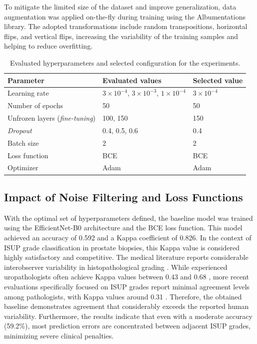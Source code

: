 To mitigate the limited size of the dataset and improve generalization, data augmentation was applied on-the-fly during training using the Albumentations library. The adopted transformations include random transpositions, horizontal flips, and vertical flips, increasing the variability of the training samples and helping to reduce overfitting.

\begin{table}[htb]
	\centering
	\begin{tabular}{lll}
		\toprule
		\textbf{Parameter} & \textbf{Evaluated values} & \textbf{Selected value} \\
		\midrule
		Learning rate & $3\times10^{-4}$, $3\times10^{-3}$, $1\times10^{-4}$ & $3\times10^{-4}$ \\
		Number of epochs & 50 & 50 \\
		Unfrozen layers (\textit{fine-tuning}) & 100, 150 & 150 \\
		\textit{Dropout} & 0.4, 0.5, 0.6 & 0.4 \\
		Batch size & 2 & 2 \\
		Loss function & BCE & BCE \\
		Optimizer & Adam & Adam \\
		\bottomrule
	\end{tabular}
	\caption{Evaluated hyperparameters and selected configuration for the experiments.}
	\label{tab:hiperparametros_gridsearch}
\end{table}

\subsection{Impact of Noise Filtering and Loss Functions}

With the optimal set of hyperparameters defined, the baseline model was trained using the EfficientNet-B0 architecture and the BCE loss function. This model achieved an accuracy of 0.592 and a Kappa coefficient of 0.826. In the context of ISUP grade classification in prostate biopsies, this Kappa value is considered highly satisfactory and competitive. The medical literature reports considerable interobserver variability in histopathological grading \cite{ozkan2016interobserver, cinar2025assessment}. While experienced uropathologists often achieve Kappa values between 0.43 and 0.68 \cite{ozkan2016interobserver}, more recent evaluations specifically focused on ISUP grades report minimal agreement levels among pathologists, with Kappa values around 0.31 \cite{cinar2025assessment}. Therefore, the obtained baseline demonstrates agreement that considerably exceeds the reported human variability. Furthermore, the results indicate that even with a moderate accuracy (59.2\%), most prediction errors are concentrated between adjacent ISUP grades, minimizing severe clinical penalties.

